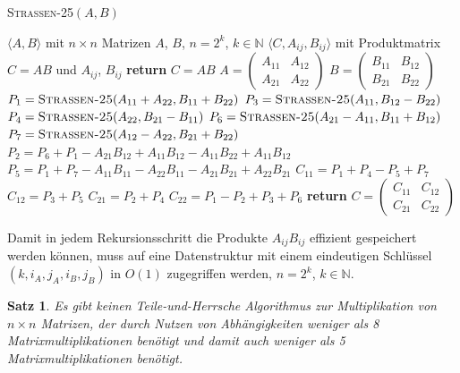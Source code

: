 \documentclass{scrartcl}
\newtheorem{satz}{Satz}[section]
\numberwithin{equation}{section}
\begin{document}
\begin{algorithm}
	\caption{\textsc{Strassen-25}$(A, B)$}
	\label{alg:strassen25}
	\begin{algorithmic}[1]
		\Require $\langle A, B \rangle$ mit $n \times n$ Matrizen $A$, $B$, $n = 2^k$, $k \in \mathbb{N}$
		\Ensure $\langle C, A_{ij}, B_{ij} \rangle$ mit Produktmatrix $C = AB$ und $A_{ij}$, $B_{ij}$
		 \textbf{return} $C = AB$
		\EndIf
		\State $A = \begin{pmatrix} A_{11} & A_{12} \\ A_{21} & A_{22} \end{pmatrix}$
		\State $B = \begin{pmatrix} B_{11} & B_{12} \\ B_{21} & B_{22} \end{pmatrix}$
		\State $P_1 = \textsc{Strassen-25}(A_{11} + A_{22}, B_{11} + B_{22})$
		\State $P_3 = \textsc{Strassen-25}(A_{11}, B_{12} - B_{22})$
		\State $P_4 = \textsc{Strassen-25}(A_{22}, B_{21} - B_{11})$
		\State $P_6 = \textsc{Strassen-25}(A_{21} - A_{11}, B_{11} + B_{12})$
		\State $P_7 = \textsc{Strassen-25}(A_{12} - A_{22}, B_{21} + B_{22})$
		\State $P_2 = P_6 + P_1 - A_{21}B_{12} + A_{11}B_{12} - A_{11}B_{22} + A_{11}B_{12}$ 
		\State $P_5 = P_1 + P_7 - A_{11}B_{11} - A_{22}B_{11} - A_{21}B_{21} + A_{22}B_{21}$
		\State $C_{11} = P_1 + P_4 - P_5 + P_7$
		\State $C_{12} = P_3 + P_5$
		\State $C_{21} = P_2 + P_4$
		\State $C_{22} = P_1 - P_2 + P_3 + P_6$
		\State \textbf{return} $C = \begin{pmatrix} C_{11} & C_{12} \\ C_{21} & C_{22} \end{pmatrix}$
	\end{algorithmic}
\end{algorithm}
Damit in jedem Rekursionsschritt die Produkte $A_{ij}B_{ij}$ effizient gespeichert werden können, muss auf eine Datenstruktur mit einem eindeutigen Schlüssel $(k, i_{A}, j_{A}, i_{B}, j_{B})$ in $O(1)$ zugegriffen werden, $n = 2^k$, $k \in \mathbb{N}$.
\begin{satz}
	Es gibt keinen Teile-und-Herrsche Algorithmus zur Multiplikation von $n \times n$ Matrizen, der durch Nutzen von Abhängigkeiten weniger als 8 Matrixmultiplikationen benötigt und damit auch weniger als 5 Matrixmultiplikationen benötigt. 
\end{satz}
\end{document}
